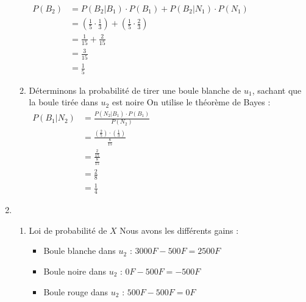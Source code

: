 \documentclass[12pt,a4paper]{article}
\begin{document}
\begin{enumerate}
\begin{enumerate}
                    \(
                    \begin{aligned}
                        P(B_2) & = P(B_2 | B_1) \cdot P(B_1) + P(B_2 | N_1) \cdot P(N_1)                                       \\
                               & = \left( \frac{1}{5} \cdot \frac{1}{3} \right) + \left( \frac{1}{5} \cdot \frac{2}{3} \right) \\
                               & = \frac{1}{15} + \frac{2}{15}                                                                 \\
                               & = \frac{3}{15}                                                                                \\
                               & = \frac{1}{5}
                    \end{aligned}
                    \)
              \item Déterminons la probabilité de tirer une boule blanche de $u_{1}$, sachant que la boule tirée dans $u_{2}$ est noire
                    On utilise le théorème de Bayes :\\
                    \(
                    \begin{aligned}
                        P(B_1 | N_2) & = \frac{P(N_2 | B_1) \cdot P(B_1)}{P(N_2)}                                          \\
                                     & =  \frac{\left( \frac{2}{5} \right) \cdot \left( \frac{1}{3} \right)}{\frac{8}{15}} \\
                                     & = \frac{\frac{2}{15}}{\frac{8}{15}}                                                 \\
                                     & = \frac{2}{8}                                                                       \\
                                     & = \frac{1}{4}
                    \end{aligned}
                    \)
          \end{enumerate}
    \item
          \begin{enumerate}
              \item Loi de probabilité de $X$ Nous avons les différents gains :
                    \begin{itemize}
                        \item Boule blanche dans $u_{2}$ : $3000F - 500F = 2500F$
                        \item Boule noire dans $u_{2}$ : $0F - 500F = -500F$
                        \item Boule rouge dans $u_{2}$ : $500F - 500F = 0F$
                    \end{itemize}


\end{enumerate}
\end{enumerate}
\end{document}
